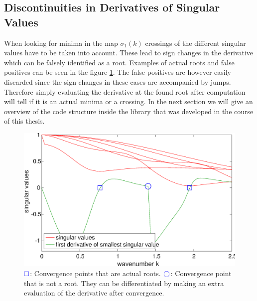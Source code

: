 \documentclass[a4paper, oneside]{thirdparty_stylesheets/discothesis}
\begin{document}
\subsection{Discontinuities in Derivatives of Singular Values}
When looking for minima in the map $\sigma_1(k)$ crossings of the different singular values have to be taken into account.
These lead to sign changes in the derivative which can be falsely identified as a root.
Examples of actual roots and false positives can be seen in the figure \ref{fig:crossings}.
The false positives are however easily discarded since the sign changes in these cases are accompanied by jumps.
Therefore simply evaluating the derivative at the found root after computation will tell if it is an actual minima or a crossing.
In the next section we will give an overview of the code structure inside the library that was developed in the course of this thesis.
\begin{figure} [H]
	\centering
	\includegraphics[width=\columnwidth]{figures/crossings.eps}
	\caption{ 
		$\textcolor{blue}\square$: Convergence points that are actual roots.
		$\textcolor{blue}\bigcirc$: Convergence point that is not a root.
		They can be differentiated by making an extra evaluation of the derivative after convergence.
	}
	\label{fig:crossings}
\end{figure}
\end{document}
